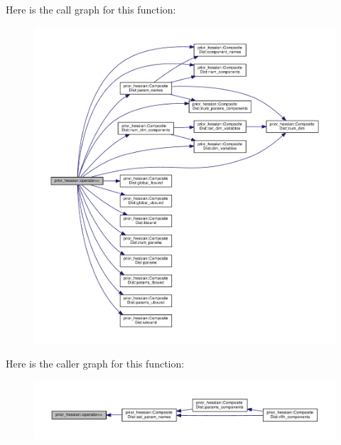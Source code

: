 Here is the call graph for this function\+:\nopagebreak
\begin{figure}[H]
\begin{center}
\leavevmode
\includegraphics[width=350pt]{namespaceprior__hessian_ab26e9ddc3b6a5caccf5d75e1a1e1af1b_cgraph}
\end{center}
\end{figure}




Here is the caller graph for this function\+:\nopagebreak
\begin{figure}[H]
\begin{center}
\leavevmode
\includegraphics[width=350pt]{namespaceprior__hessian_ab26e9ddc3b6a5caccf5d75e1a1e1af1b_icgraph}
\end{center}
\end{figure}


